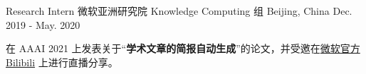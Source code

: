 \begin{cventries}
  \cventry
    {Research Intern} %
    {微软亚洲研究院 Knowledge Computing 组} %
    {Beijing, China} %
    {Dec. 2019 - May. 2020} %
    {
      \begin{cvitems} %
        \item {在 AAAI 2021 上发表关于``\textbf{学术文章的简报自动生成}''的论文，并受邀在\href{https://www.bilibili.com/video/BV1fV411q7Ho/}{微软官方 Bilibili} 上进行直播分享。}
      \end{cvitems}
    }

\end{cventries}
